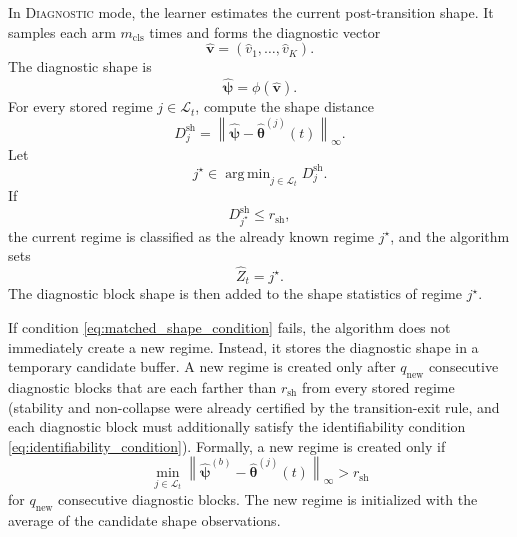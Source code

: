 \documentclass[11pt]{article}
\newcommand{\norm}[1]{\left\lVert #1 \right\rVert}
\DeclareMathOperator*{\argmin}{arg\,min}
\begin{document}
In \textsc{Diagnostic} mode, the learner estimates the current post-transition shape. It samples each arm $m_{\mathrm{cls}}$ times and forms the diagnostic vector
\begin{equation}
\label{eq:diagnostic_vector}
\widehat{\bm v}
=
(\widehat v_1,\ldots,\widehat v_K).
\end{equation}
The diagnostic shape is
\begin{equation}
\label{eq:diagnostic_shape}
\widehat{\bm\psi}
=
\phi(\widehat{\bm v}).
\end{equation}
For every stored regime $j\in\mathcal L_t$, compute the shape distance
\begin{equation}
\label{eq:shape_matching_distance}
D_j^{\mathrm{sh}}
=
\norm{\widehat{\bm\psi}-\widehat{\bm\theta}^{(j)}(t)}_{\infty}.
\end{equation}
Let
\begin{equation}
\label{eq:nearest_shape_regime}
j^\star
\in
\argmin_{j\in\mathcal L_t}D_j^{\mathrm{sh}}.
\end{equation}
If
\begin{equation}
\label{eq:matched_shape_condition}
D_{j^\star}^{\mathrm{sh}}\leq r_{\mathrm{sh}},
\end{equation}
the current regime is classified as the already known regime $j^\star$, and the algorithm sets
\begin{equation}
\label{eq:set_matched_shape_regime}
\widehat Z_t=j^\star.
\end{equation}
The diagnostic block shape is then added to the shape statistics of regime $j^\star$.

If condition \eqref{eq:matched_shape_condition} fails, the algorithm does not immediately create a new regime. Instead, it stores the diagnostic shape in a temporary candidate buffer. A new regime is created only after $q_{\mathrm{new}}$ consecutive diagnostic blocks that are each farther than $r_{\mathrm{sh}}$ from every stored regime (stability and non-collapse were already certified by the transition-exit rule, and each diagnostic block must additionally satisfy the identifiability condition \eqref{eq:identifiability_condition}). Formally, a new regime is created only if
\begin{equation}
\label{eq:persistent_new_regime_condition}
\min_{j\in\mathcal L_t}
\norm{\widehat{\bm\psi}^{(b)}-
\widehat{\bm\theta}^{(j)}(t)}_{\infty}
>
r_{\mathrm{sh}}
\end{equation}
for $q_{\mathrm{new}}$ consecutive diagnostic blocks. The new regime is initialized with the average of the candidate shape observations.
\end{document}
